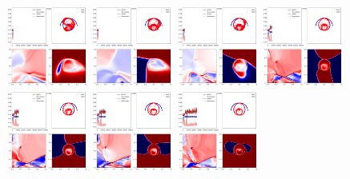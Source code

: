 \documentclass[lang=cn,11pt]{elegantpaper}
\begin{document}
\begin{figure}[hbp]
  \centering
  \includegraphics[width=0.24\textwidth]{wings_3_1}
  \includegraphics[width=0.24\textwidth]{wings_3_2}
  \includegraphics[width=0.24\textwidth]{wings_3_3}
  \includegraphics[width=0.24\textwidth]{wings_3_4}\\
  \includegraphics[width=0.24\textwidth]{wings_3_5}
  \includegraphics[width=0.24\textwidth]{wings_3_6}
  \includegraphics[width=0.24\textwidth]{wings_3_7}

\end{figure}
\end{document}
